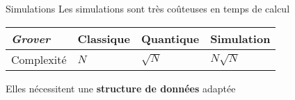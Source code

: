 \begin{frame}{Simulations}
  Les simulations sont très coûteuses en temps de calcul
  \begin{table}[]
    \begin{tabular}{l|l|l|l}
        \textit{Grover} & Classique & Quantique & Simulation    \\ \hline \rule{0pt}{2.6ex}
    Complexité & $N$       & $\sqrt N$ & {\color{cs}$N \sqrt N$}
    \end{tabular}
  \end{table}

  \vspace{1em}

  Elles nécessitent une \textbf{structure de données} adaptée
\end{frame}